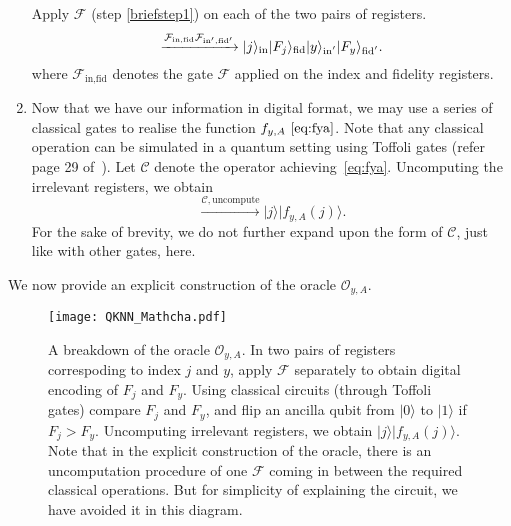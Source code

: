\documentclass[a4paper,twocolumn,11pt,unpublished]{quantumarticle}
\newcommand{\rang}{\rangle}
\begin{document}
\begin{enumerate}
        Apply $\mathcal F$ (step \ref{briefstep1}) on each of the two pairs of registers.     
        \begin{equation}
            \xrightarrow{{ \mathcal{F}_{\text{in,fid}} \mathcal{F}_{\text{in}',\text{fid}'}}} \\|j\rang_{\text{in}} |F_j\rang_{\text{fid}} |y\rang_{\text{in$'$}} |F_y\rang_{\text{fid$'$}}.
        \end{equation}
        where $\mathcal{F}_{\text{in,fid}}$ denotes the gate $\mathcal{F}$ applied on the index and fidelity registers.
        
        \item Now that we have our information in digital format, we may use a series of classical gates to realise the function $f_{y,A}~\eqref{eq:fya}$. Note that any classical operation can be simulated in a quantum setting using Toffoli gates (refer page 29 of~\cite{Nielsen2011}). Let $\mathcal C$ denote the operator achieving~\eqref{eq:fya}. Uncomputing the irrelevant registers, we obtain
        \begin{equation}
            \xrightarrow{\mathcal C, \text{uncompute}} |j\rang |f_{y,A}(j)\rang.
        \end{equation}
        For the sake of brevity, we do not further expand upon the form of $\mathcal C$, just like with other gates, here.         
        
    \end{enumerate}
    We now provide an explicit construction of the oracle $\mathcal O_{y,A}$.
      
    \begin{figure}
                \begin{center}
                    \texttt{[image: QKNN\_Mathcha.pdf]}
                    \caption{A breakdown of the oracle $\mathcal O_{y,A}$. In two pairs of registers correspoding to index $j$ and $y$, apply $\mathcal F$ separately to obtain digital encoding of $F_j$ and $F_y$. Using classical circuits (through Toffoli gates) compare $F_j$ and $F_y$, and flip an ancilla qubit from $|0\rang$ to $|1\rang$ if $F_j>F_y$. Uncomputing irrelevant registers, we obtain $|j\rang |f_{y,A}(j)\rang$. Note that in the explicit construction of the oracle, there is an uncomputation procedure of one $\mathcal{F}$ coming in between the required classical operations. But for simplicity of explaining the circuit, we have avoided it in this diagram. }
                    \label{fig:OyaBreakdown}
            \end{center}
    \end{figure}
        
\end{document}
